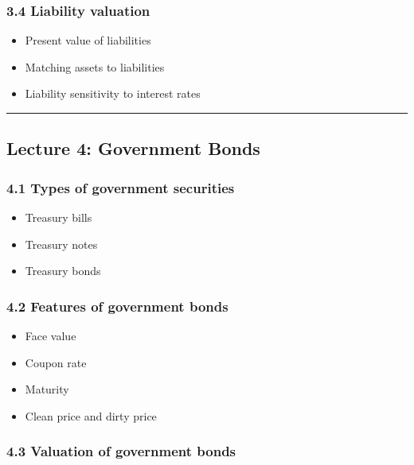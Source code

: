 \documentclass[
  letterpaper,
  DIV=11,
  numbers=noendperiod]{scrartcl}
\providecommand{\tightlist}{%
  \setlength{\itemsep}{0pt}\setlength{\parskip}{0pt}}
\begin{document}
\subsubsection{3.4 Liability valuation}\label{liability-valuation}

\begin{itemize}
\tightlist
\item
  Present value of liabilities
\item
  Matching assets to liabilities
\item
  Liability sensitivity to interest rates
\end{itemize}

\begin{center}\rule{0.5\linewidth}{0.5pt}\end{center}

\subsection{Lecture 4: Government
Bonds}\label{lecture-4-government-bonds}

\subsubsection{4.1 Types of government
securities}\label{types-of-government-securities}

\begin{itemize}
\tightlist
\item
  Treasury bills
\item
  Treasury notes
\item
  Treasury bonds
\end{itemize}

\subsubsection{4.2 Features of government
bonds}\label{features-of-government-bonds}

\begin{itemize}
\tightlist
\item
  Face value
\item
  Coupon rate
\item
  Maturity
\item
  Clean price and dirty price
\end{itemize}

\subsubsection{4.3 Valuation of government
bonds}\label{valuation-of-government-bonds}
\end{document}
